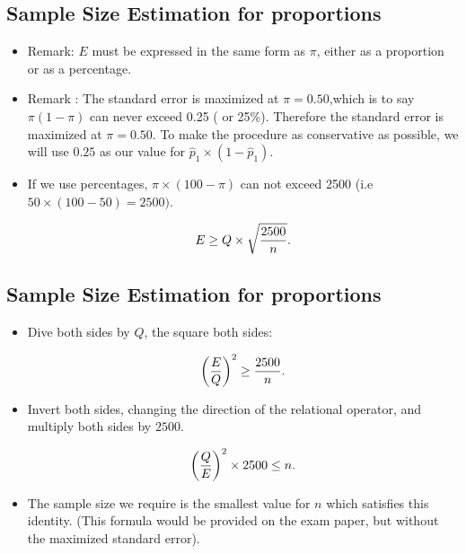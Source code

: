\documentclass[]{report}
\begin{document}

\subsection{Sample Size Estimation for proportions}
\begin{itemize}
\item Remark: $E$ must be expressed in the same form as $\pi$, either as a proportion or as a percentage.
\item Remark : The standard error is maximized at $\pi = 0.50$,which is to say $\pi(1-\pi)$ can never exceed 0.25 ( or 25\%). Therefore the standard error is maximized at $\pi = 0.50$. To make the procedure as conservative as possible, we will use $0.25$ as our value for $\hat{p}_1 \times (1 - \hat{p}_1)$.
\item If we use percentages, $\pi \times (100-\pi)$ can not exceed 2500 (i.e $ 50 \times (100-50)=2500)$.

\[ E \geq Q \times \sqrt{{2500 \over n}}. \]


\end{itemize}



\subsection{Sample Size Estimation for proportions}

\begin{itemize}

\item Dive both sides by $Q$, the square both sides:

\[ \left({E\over Q}\right)^2 \geq {2500 \over n}. \]

\item Invert both sides, changing the direction of the relational operator, and multiply both sides by $2500$.

\[ \left({Q\over E}\right)^2 \times 2500 \leq n. \]

\item The sample size we require is the smallest value for $n$ which satisfies this identity. (This formula would be provided on the exam paper, but without the maximized standard error).
\end{itemize}

\end{document}
